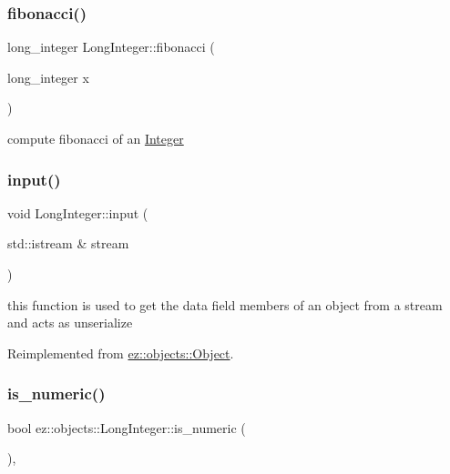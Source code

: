 \subsubsection{\texorpdfstring{fibonacci()}{fibonacci()}}
{\footnotesize\ttfamily long\+\_\+integer Long\+Integer\+::fibonacci (\begin{DoxyParamCaption}\item[{long\+\_\+integer}]{x }\end{DoxyParamCaption})\hspace{0.3cm}{\ttfamily [static]}}

compute fibonacci of an \hyperlink{classez_1_1objects_1_1Integer}{Integer} \mbox{\label{classez_1_1objects_1_1LongInteger_a9fa1d50b8d4d7e2ea2383bb625712349}} 
\subsubsection{\texorpdfstring{input()}{input()}}
{\footnotesize\ttfamily void Long\+Integer\+::input (\begin{DoxyParamCaption}\item[{std\+::istream \&}]{stream }\end{DoxyParamCaption})\hspace{0.3cm}{\ttfamily [virtual]}}

this function is used to get the data field members of an object from a stream and acts as unserialize 

Reimplemented from \hyperlink{classez_1_1objects_1_1Object_a878bdc53b7f16fda6fa15dab214c4b6a}{ez\+::objects\+::\+Object}.

\mbox{\label{classez_1_1objects_1_1LongInteger_ad9241d39b14d6cff1173c692ac37c8fc}} 
\subsubsection{\texorpdfstring{is\+\_\+numeric()}{is\_numeric()}}
{\footnotesize\ttfamily bool ez\+::objects\+::\+Long\+Integer\+::is\+\_\+numeric (\begin{DoxyParamCaption}{ }\end{DoxyParamCaption})\hspace{0.3cm}{\ttfamily [inline]}, {\ttfamily [virtual]}}

